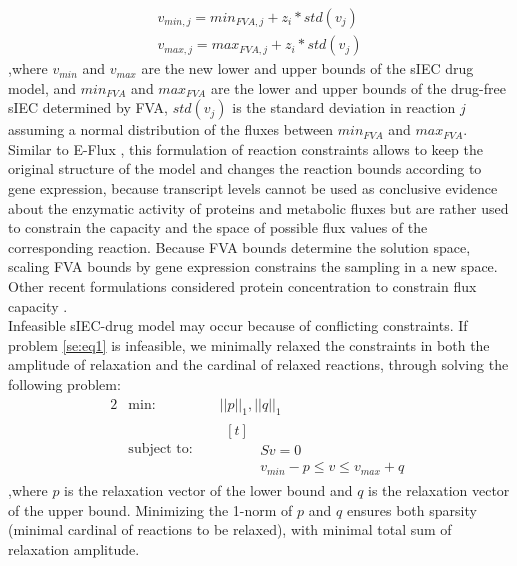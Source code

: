 \begin{equation*}
\begin{gathered}
v_{min,j}=min_{FVA,j}+z_i*std(v_j)\\
v_{max,j}=max_{FVA,j}+z_i*std(v_j)
\end{gathered}
\end{equation*}
,where $v_{min}$ and $v_{max}$ are the new lower and upper bounds of the sIEC drug model, and $min_{FVA}$ and $max_{FVA}$ are the lower and upper bounds of the drug-free sIEC determined by FVA, $std(v_j)$ is the standard deviation in reaction $j$ assuming a normal distribution of the fluxes between $min_{FVA}$ and $max_{FVA}$.
Similar to E-Flux \cite{colijn2009interpreting,brandes2012inferring}, this formulation of reaction constraints allows to keep the original structure of the model and changes the reaction bounds according to gene expression, because transcript levels cannot be used as conclusive evidence about the enzymatic activity of proteins \cite{machado2014systematic,kosti2016cross,franks2017post} and metabolic fluxes but are rather used to constrain the capacity and the space of possible flux values of the corresponding reaction. Because FVA bounds determine the solution space, scaling FVA bounds by gene expression constrains the sampling in a new space. Other recent formulations considered protein concentration to constrain flux capacity \cite{sanchez2017improving}.\\
Infeasible sIEC-drug model may occur because of conflicting constraints. If problem \ref{se:eq1} is infeasible, we minimally relaxed the constraints in both the amplitude of relaxation and the cardinal of relaxed reactions, through solving the following problem:
\begin{alignat*}{2} 
  & \text{min: } &  & ||p||_{1},||q||_{1}\\
  & \text{subject to: } &  &  
                \begin{aligned}[t] \\
                & Sv=0 \\
                & v_{min} - p \leq v  \leq  v_{max} + q
                \end{aligned}
\end{alignat*}
,where $p$ is the relaxation vector of the lower bound and $q$ is the relaxation vector of the upper bound. Minimizing the 1-norm of $p$ and $q$ ensures both sparsity (minimal cardinal of reactions to be relaxed), with minimal total sum of relaxation amplitude.
